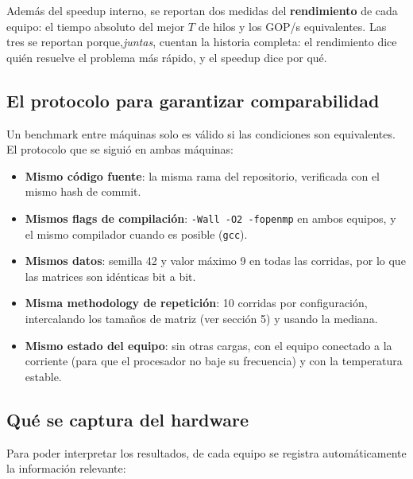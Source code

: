 Además del speedup interno, se reportan dos medidas del \textbf{rendimiento} de cada equipo: el tiempo absoluto del mejor $T$ de hilos y los GOP/s equivalentes. Las tres se reportan porque,\emph{juntas}, cuentan la historia completa: el rendimiento dice quién resuelve el problema más rápido, y el speedup dice por qué.

\subsection{El protocolo para garantizar comparabilidad}

Un benchmark entre máquinas solo es válido si las condiciones son equivalentes. El protocolo que se siguió en ambas máquinas:

\begin{itemize}
    \item \textbf{Mismo código fuente}: la misma rama del repositorio, verificada con el mismo hash de commit.
    \item \textbf{Mismos flags de compilación}: \texttt{-Wall -O2 -fopenmp} en ambos equipos, y el mismo compilador cuando es posible (\texttt{gcc}).
    \item \textbf{Mismos datos}: semilla 42 y valor máximo 9 en todas las corridas, por lo que las matrices son idénticas bit a bit.
    \item \textbf{Misma methodology de repetición}: 10 corridas por configuración, intercalando los tamaños de matriz (ver sección 5) y usando la mediana.
    \item \textbf{Mismo estado del equipo}: sin otras cargas, con el equipo conectado a la corriente (para que el procesador no baje su frecuencia) y con la temperatura estable.
\end{itemize}

\subsection{Qué se captura del hardware}

Para poder interpretar los resultados, de cada equipo se registra automáticamente la información relevante:


